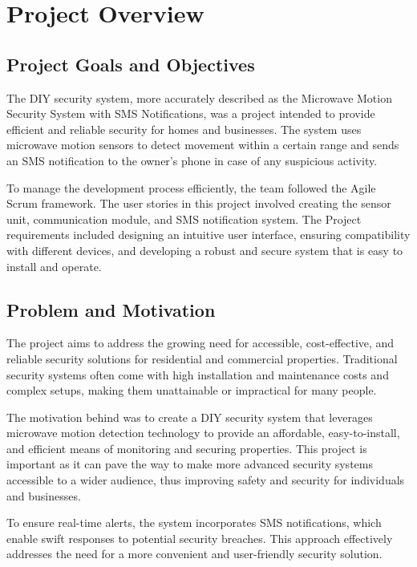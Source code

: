 \section{Project Overview}\label{sec:project-overview}

\subsection{Project Goals and Objectives}\label{subsec:project-goals-and-objectives}
The \brand{} DIY security system, more accurately described as the Microwave Motion
Security System with SMS Notifications, was a project intended to provide efficient
and reliable security for homes and businesses. %
The system uses microwave motion sensors to detect movement within a certain range and sends an SMS notification to the owner's
phone in case of any suspicious activity. %

To manage the development process efficiently, the team followed the Agile Scrum framework. %
The user stories in this project involved creating the sensor unit, communication module,
and SMS notification system. %
The Project requirements included designing an intuitive user interface, ensuring compatibility with different devices, and developing a robust and
secure system that is easy to install and operate. %

\subsection{Problem and Motivation}\label{subsec:problem-and-motivation}

The \brand{} project aims to address the growing need for accessible, cost-effective,
and reliable security solutions for residential and commercial properties. %
Traditional security systems often come with high installation and maintenance costs and complex
setups, making them unattainable or impractical for many people. %

The motivation behind \brand{} was to create a DIY security system that leverages
microwave motion detection technology to provide an affordable, easy-to-install, and
efficient means of monitoring and securing properties. %
This project is important as it can pave the way to make more advanced security systems accessible to a wider
audience, thus improving safety and security for individuals and businesses. %

To ensure real-time alerts, the system incorporates SMS notifications, which enable
swift responses to potential security breaches. %
This approach effectively addresses the need for a more convenient and user-friendly security solution. %

